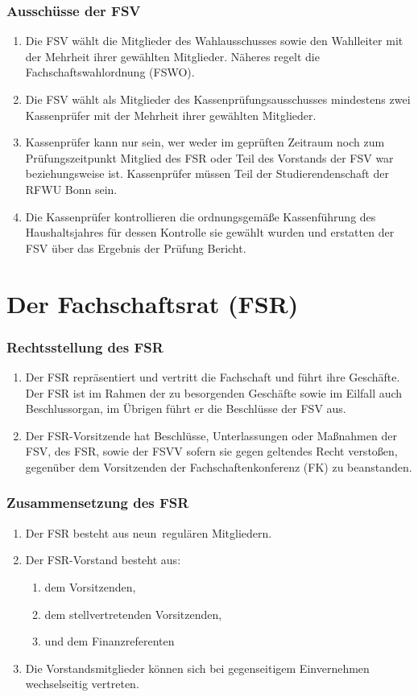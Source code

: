 \documentclass{article}
\newcommand{\fsrgroesse}{neun}
\begin{document}
\section{Ausschüsse der FSV}
\begin{enumerate}[(1)]
    \item Die FSV wählt die Mitglieder des Wahlausschusses sowie den Wahlleiter mit der Mehrheit ihrer gewählten Mitglieder. Näheres regelt die Fachschaftswahlordnung (FSWO).
    \item Die FSV wählt als Mitglieder des Kassenprüfungsausschusses mindestens zwei Kassenprüfer mit der Mehrheit ihrer gewählten Mitglieder.
    \item Kassenprüfer kann nur sein, wer weder im geprüften Zeitraum noch zum Prüfungszeitpunkt Mitglied des FSR oder Teil des Vorstands der FSV war beziehungsweise ist. Kassenprüfer müssen Teil der Studierendenschaft der RFWU Bonn sein.
    \item Die Kassenprüfer kontrollieren die ordnungsgemäße Kassenführung des Haushaltsjahres für dessen Kontrolle sie gewählt wurden und erstatten der FSV über das Ergebnis der Prüfung Bericht.
\end{enumerate}

\part{Der Fachschaftsrat (FSR)}
\section{Rechtsstellung des FSR}
\begin{enumerate}[(1)]
    \item Der FSR repräsentiert und vertritt die Fachschaft und führt ihre Geschäfte. Der FSR ist im Rahmen der zu besorgenden Geschäfte sowie im Eilfall auch Beschlussorgan, im Übrigen führt er die Beschlüsse der FSV aus.
    \item Der FSR-Vorsitzende hat Beschlüsse, Unterlassungen oder Maßnahmen der FSV, des FSR, sowie der FSVV sofern sie gegen geltendes Recht verstoßen, gegenüber dem Vorsitzenden der Fachschaftenkonferenz (FK) zu beanstanden.
\end{enumerate}

\section{Zusammensetzung des FSR}
\begin{enumerate}[(1)]
    \item Der FSR besteht aus \fsrgroesse \ regulären Mitgliedern.
    \item Der FSR-Vorstand besteht aus:
	\begin{enumerate}[1.]
		\item dem Vorsitzenden,
		\item dem stellvertretenden Vorsitzenden,
		\item und dem Finanzreferenten
	\end{enumerate}
	\item Die Vorstandsmitglieder können sich bei gegenseitigem Einvernehmen wechselseitig vertreten.
\end{enumerate}
\end{document}
